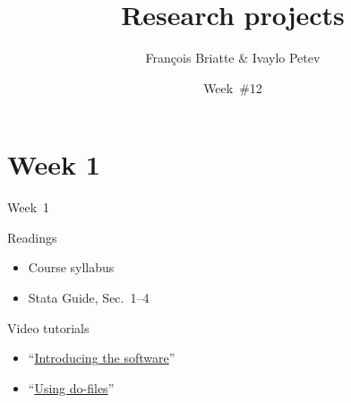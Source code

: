 \documentclass[t]{beamer}
\title{Research projects}
\author{François Briatte \& Ivaylo Petev}
\date{Week~\#12}
\begin{document}
    
    \frame[plain]{
        \titlepage\\[7em]
        \tableofcontents[hideallsubsections]
        }
    



    \section*{Week 1}

	\begin{frame}[c]{Week~1}
		
		\begin{block}{Readings}

			\begin{itemize}
				\item Course syllabus
				\item Stata Guide, Sec.~1--4
			\end{itemize}

		\end{block}

		\begin{block}{Video tutorials}
			
			\begin{itemize}
				\item ``\href{http://youtu.be/Uq0IS4dRtEQ}{Introducing the software}''
				
				\item ``\href{http://youtu.be/AlEmUqMBx4A}{Using do-files}''
			\end{itemize}
		
		\end{block}

	\end{frame}
\end{document}
